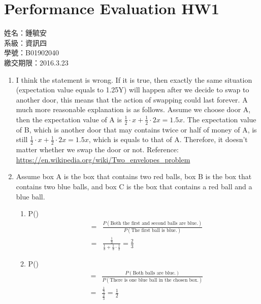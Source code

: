 \documentclass[UTF8,nofonts]{ctexart}
\begin{document}
\section*{Performance Evaluation HW1}
  \noindent
  姓名：鍾毓安         \\
  系級：資訊四 	     \\
  學號：B01902040     \\
  繳交期限：2016.3.23
  \begin{enumerate}
    \item{
      I think the statement is wrong.
      If it is true, then exactly the same situation (expectation value equals to 1.25Y) will happen after we decide to swap to another door, this means that the action of swapping could last forever.
      A much more reasonable explanation is as follows.
      Assume we choose door A, then the expectation value of A is $\frac{1}{2} \cdot x + \frac{1}{2} \cdot 2x = 1.5x$.
      The expectation value of B, which is another door that may contains twice or half of money of A, is still $\frac{1}{2} \cdot x + \frac{1}{2} \cdot 2x = 1.5x$, which is equals to that of A.
      Therefore, it doesn't matter whether we swap the door or not.
      Reference: \url{https://en.wikipedia.org/wiki/Two_envelopes_problem}
    }
    \item{
      Assume box A is the box that contains two red balls, box B is the box that contains two blue balls, and box C is the box that contains a red ball and a blue ball.
      \begin{enumerate}
        \item{
          P() 
          \begin{eqnarray*}
            &=& \frac{P(\text{Both the first and second balls are blue.})}{P(\text{The first ball is blue.})} \\
            &=& \frac{\frac{1}{3}}{\frac{1}{3} + \frac{1}{3}\cdot \frac{1}{2}} = \frac{2}{3}
          \end{eqnarray*}
        }
        \item{
          P({})
          \begin{eqnarray*}
            &=& \frac{P(\text{Both balls are blue.})}{P(\text{There is one blue ball in the chosen box.})} \\
            &=& \frac{\frac{1}{3}}{\frac{2}{3}} = \frac{1}{2}
          \end{eqnarray*}
        }

\end{enumerate}}
\end{enumerate}
\end{document}
